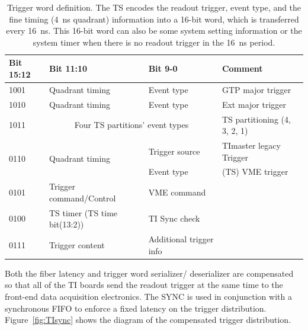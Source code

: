 \begin{table}
\begin{adjustbox}{width=\columnwidth,center}
	\begin{tabular}{| l | l | l | l |}
		\hline \hline
		Bit 15:12		& 	Bit 11:10 &	Bit 9-0	 & Comment		\\
		\hline
	1001	& Quadrant timing	& Event type	 & GTP major trigger \\
	1010	& Quadrant timing	& Event type	 & Ext major trigger \\
	
	1011	& \multicolumn{2}{c}{Four TS partitions’ event types}  & TS partitioning (4, 3, 2, 1)  \\

	\multirow{2}{*}{0110}	& \multirow{2}{*}{Quadrant timing}	& Trigger source & TImaster legacy Trigger \\
		    &                   & Event type	 & (TS) VME trigger     \\
	0101	& Trigger command/Control	& VME command & \\
	0100	& TS timer (TS time bit(13:2))	& TI Sync check & \\
	0111	& Trigger content	& Additional trigger info & \\
		\hline \hline
	\end{tabular}
\end{adjustbox}
\caption{Trigger word definition. The TS encodes the readout trigger, event type, and the fine timing (4~ns quadrant)
  information into a 16-bit word, which is transferred every 16~ns. This 16-bit word can also be some system setting
  information or the system timer when there is no readout trigger in the 16~ns period.}
\label{tab:trigger_word_definition}
\end{table}

Both the fiber latency and trigger word serializer/ deserializer are compensated so that all of the TI boards send the
readout trigger at the same time to the front-end data acquisition electronics.  The SYNC is used in conjunction with a
synchronous FIFO to enforce a fixed latency on the trigger distribution. Figure~\ref{fig:TIsync} shows the diagram of
the compensated trigger distribution.

